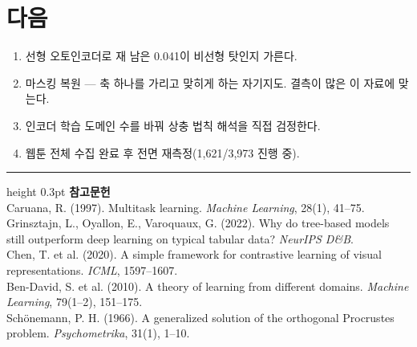 \documentclass[10pt]{article}
\begin{document}
\section{다음}

\begin{enumerate}[leftmargin=1.3em,itemsep=0.15em]
\item 선형 오토인코더로 재 남은 0.041이 비선형 탓인지 가른다.
\item 마스킹 복원 --- 축 하나를 가리고 맞히게 하는 자기지도. 결측이 많은 이
      자료에 맞는다.
\item 인코더 학습 도메인 수를 바꿔 상충 법칙 해석을 직접 검정한다.
\item 웹툰 전체 수집 완료 후 전면 재측정(1,621/3,973 진행 중).
\end{enumerate}

\vspace{0.6em}
\hrule height 0.3pt
\vspace{0.5em}
{\footnotesize
\textbf{참고문헌}\\[0.3em]
Caruana, R. (1997). Multitask learning. \emph{Machine Learning}, 28(1), 41--75.\\[0.15em]
Grinsztajn, L., Oyallon, E., Varoquaux, G. (2022). Why do tree-based models still
outperform deep learning on typical tabular data? \emph{NeurIPS D\&B}.\\[0.15em]
Chen, T. et al. (2020). A simple framework for contrastive learning of visual
representations. \emph{ICML}, 1597--1607.\\[0.15em]
Ben-David, S. et al. (2010). A theory of learning from different domains.
\emph{Machine Learning}, 79(1--2), 151--175.\\[0.15em]
Schönemann, P. H. (1966). A generalized solution of the orthogonal Procrustes
problem. \emph{Psychometrika}, 31(1), 1--10.
}
\end{document}
